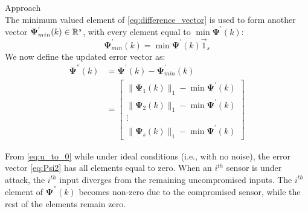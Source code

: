 \begin{section}{Approach}
\begin{equation}
	\end{equation}
The minimum valued element of \eqref{eq:difference_vector} is used to form another vector $\bm{\Psi}^{'}_{min}(k) \in \mathbb{R}^s$, with every element equal to $\min \bm{\Psi}^{'}(k)$:
    \begin{equation}
	\bm{\Psi}^{'}_{min}(k)=\min \bm{\Psi}^{'}(k) \vec{1}_s
	\end{equation}
We now define the updated error vector as:
    \begin{align}
    \label{eq:Psi2}
	\bm{\Psi}^{''}(k)&=\bm{\Psi}^{'}(k)-\bm{\Psi}^{'}_{min}(k) \\
	& =\begin{bmatrix} \lVert{\bm{\Psi}_1(k)}\rVert_1 - \min \bm{\Psi}^{'}(k)\\ \lVert{\bm{\Psi}_2(k)}\rVert_1 - \min \bm{\Psi}^{'}(k) \\ \vdots \\ \lVert{\bm{\Psi}_s(k)}\rVert_1 - \min \bm{\Psi}^{'}(k) \end{bmatrix}
	\end{align}
	
From \eqref{eq:u_to_0} while under ideal conditions (i.e., with no noise), the error vector \eqref{eq:Psi2} has all elements equal to zero. When an $i^{th}$ sensor is under attack, the $i^{th}$ input diverges from the remaining uncompromised inputs. The $i^{th}$ element of $\bm{\Psi}^{''}(k)$ becomes non-zero due to the compromised sensor, while the rest of the elements remain zero. 


\end{section}
